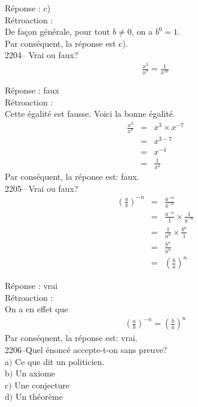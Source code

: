 \documentclass[letterpaper, 12pt]{article}
\begin{document}
R\'eponse : c)\\

R\'etroaction :\\
De fa\c con g\'en\'erale, pour tout $b\neq0$, on a $b^{0}=1$.\\
Par cons\'equent, la r\'eponse est c).\\

2204-- Vrai ou faux?
\begin{eqnarray*}
 \frac{x^{3}}{x^{7}}=\frac{1}{x^{10}}
\end{eqnarray*}

R\'eponse : faux\\

R\'etroaction :\\
Cette \'egalit\'e est fausse. Voici la bonne \'egalit\'e.
\begin{eqnarray*}
 \frac{x^{3}}{x^{7}}&=&x^{3}\times x^{-7}\\
&=&x^{3-7}\\
&=&x^{-4}\\[2mm]
&=&\frac{1}{x^{4}}
\end{eqnarray*}
Par cons\'equent, la r\'eponse est: faux.\\

2205-- Vrai ou faux? \\
\begin{eqnarray*}
 \left( \frac{a}{b} \right)^{-n}&=& \frac{a^{-n}}{b^{-n}}\\[2mm]
&=&  \frac{a^{-n}}{1} \times \frac{1}{b^{-n}}\\[2mm]
&=&  \frac{1}{a^{n}} \times \frac{b^{n}}{1}\\[2mm]
&=&  \frac{b^{n}}{a^{n}}\\[2mm]
&=& \left( \frac{b}{a} \right)^{n}
\end{eqnarray*}

R\'eponse : vrai\\

R\'etroaction :\\
On a en effet que
\begin{eqnarray*}
 \left( \frac{a}{b} \right)^{-n}= \left( \frac{b}{a} \right)^{n}
\end{eqnarray*}
Par cons\'equent, la r\'eponse est: vrai.\\

2206--Quel \'enonc\'e accepte-t-on sans preuve?\\

a$)$ Ce que dit un politicien.\\
b$)$ Un axiome\\
c$)$ Une conjecture\\
d$)$ Un th\'eor\`eme\\
\end{document}
